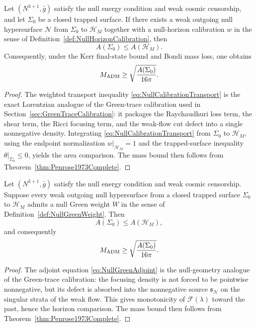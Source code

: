 \begin{theorem}\label{thm:NullHorizonCalibration}
Let $(N^{3+1},\bar g)$ satisfy the null energy condition and weak cosmic censorship, and let $\Sigma_0$ be a closed trapped surface. If there exists a weak outgoing null hypersurface $\mathcal N$ from $\Sigma_0$ to $\mathcal H_M$ together with a null-horizon calibration $w$ in the sense of Definition~\ref{def:NullHorizonCalibration}, then
\[
    A(\Sigma_0)\le A(\mathcal H_M).
\]
Consequently, under the Kerr final-state bound and Bondi mass loss, one obtains
\[
    M_{\mathrm{ADM}}\ge \sqrt{\frac{A(\Sigma_0)}{16\pi}}.
\]
\end{theorem}

\begin{proof}
The weighted transport inequality \eqref{eq:NullCalibrationTransport} is the exact Lorentzian analogue of the Green-trace calibration used in Section~\ref{sec:GreenTraceCalibration}: it packages the Raychaudhuri loss term, the shear term, the Ricci focusing term, and the weak-flow cut defect into a single nonnegative density. Integrating \eqref{eq:NullCalibrationTransport} from $\Sigma_0$ to $\mathcal H_M$, using the endpoint normalization $w|_{\mathcal H_M}=1$ and the trapped-surface inequality $\theta|_{\Sigma_0}\le0$, yields the area comparison. The mass bound then follows from Theorem~\ref{thm:Penrose1973Complete}.
\end{proof}

\begin{theorem}\label{thm:NullGreenCalibration}
Let $(N^{3+1},\bar g)$ satisfy the null energy condition and weak cosmic censorship. Suppose every weak outgoing null hypersurface from a closed trapped surface $\Sigma_0$ to $\mathcal H_M$ admits a null Green weight $W$ in the sense of Definition~\ref{def:NullGreenWeight}. Then
\[
    A(\Sigma_0)\le A(\mathcal H_M),
\]
and consequently
\[
    M_{\mathrm{ADM}}\ge \sqrt{\frac{A(\Sigma_0)}{16\pi}}.
\]
\end{theorem}

\begin{proof}
The adjoint equation \eqref{eq:NullGreenAdjoint} is the null-geometry analogue of the Green-trace calibration: the focusing density is not forced to be pointwise nonnegative, but its defect is absorbed into the nonnegative source $\mathfrak s_{\mathcal N}$ on the singular strata of the weak flow. This gives monotonicity of $\mathcal F(\lambda)$ toward the past, hence the horizon comparison. The mass bound then follows from Theorem~\ref{thm:Penrose1973Complete}.
\end{proof}

